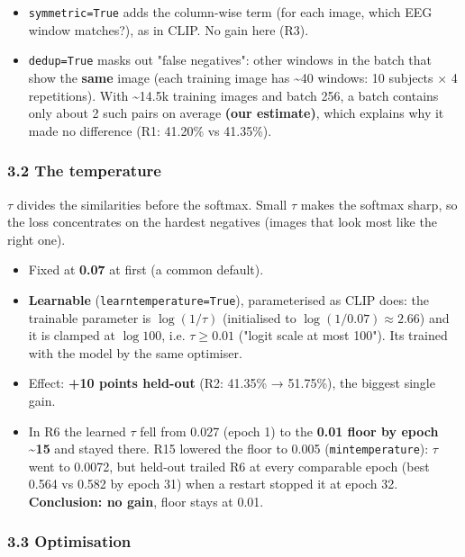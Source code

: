 \documentclass[
  11pt,
]{article}
\providecommand{\tightlist}{%
  \setlength{\itemsep}{0pt}\setlength{\parskip}{0pt}}
\renewcommand{\_}{\oldunderscore\allowbreak}
\begin{document}
\begin{itemize}
\tightlist
\item
  \texttt{symmetric=True} adds the
  column-wise term (for each image,
  which EEG window matches?), as in
  CLIP. No gain here (R3).
\item
  \texttt{dedup=True} masks out "false
  negatives": other windows in the batch
  that show the \textbf{same} image
  (each training image has
  \textasciitilde40 windows: 10 subjects
  × 4 repetitions). With
  \textasciitilde14.5k training images
  and batch 256, a batch contains only
  about 2 such pairs on average
  \textbf{(our estimate)}, which
  explains why it made no difference
  (R1: 41.20\% vs 41.35\%).
\end{itemize}

\subsubsection{3.2 The
temperature}\label{the-temperature}

\(\tau\) divides the similarities before
the softmax. Small \(\tau\) makes the
softmax sharp, so the loss concentrates
on the hardest negatives (images that
look most like the right one).

\begin{itemize}
\tightlist
\item
  Fixed at \textbf{0.07} at first (a
  common default).
\item
  \textbf{Learnable}
  (\texttt{learn\_temperature=True}),
  parameterised as CLIP does: the
  trainable parameter is
  \(\log(1/\tau)\) (initialised to
  \(\log(1/0.07) \approx 2.66\)) and it
  is clamped at \(\log 100\), i.e.
  \textbf{\(\tau \ge 0.01\)} ("logit
  scale at most 100").
  It\textquotesingle s trained with the
  model by the same optimiser.
\item
  Effect: \textbf{+10 points held-out}
  (R2: 41.35\% → 51.75\%), the biggest
  single gain.
\item
  In R6 the learned \(\tau\) fell from
  0.027 (epoch 1) to the \textbf{0.01
  floor by epoch \textasciitilde15} and
  stayed there. R15 lowered the floor to
  0.005 (\texttt{min\_temperature}):
  \(\tau\) went to 0.0072, but held-out
  trailed R6 at every comparable epoch
  (best 0.564 vs 0.582 by epoch 31) when
  a restart stopped it at epoch 32.
  \textbf{Conclusion: no gain}, floor
  stays at 0.01.
\end{itemize}

\subsubsection{3.3
Optimisation}\label{optimisation}
\end{document}
